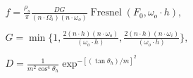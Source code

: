 \begin{equation}
    \begin{array}{c}
        \displaystyle f = 
            \frac{\rho_{s}}{\pi}
            \frac{DG}{({n}\cdot{\Omega_{i}})
                      ({n}\cdot{\omega_{o}})}
            \operatorname{Fresnel}(F_{0},\omega_{o}\cdot{h}),
            \\ \\
        \displaystyle G = 
            \min\lbrace 1, 
                \frac{2({n}\cdot{h})
                       ({n}\cdot{\omega_{o}})}
                     {(\omega_{o}\cdot{h})},
                \frac{2({n}\cdot{h})
                       ({n}\cdot{\omega_{i}})}
                     {(\omega_{o}\cdot{h})}
                        \rbrace, 
            \\ \\
        \displaystyle D = 
            \frac{1}{m^{2}\cos^{4}\theta_{h}}
            \exp^{-[(\tan\theta_{h})/{m}]^{2}}
    \end{array}
\end{equation}